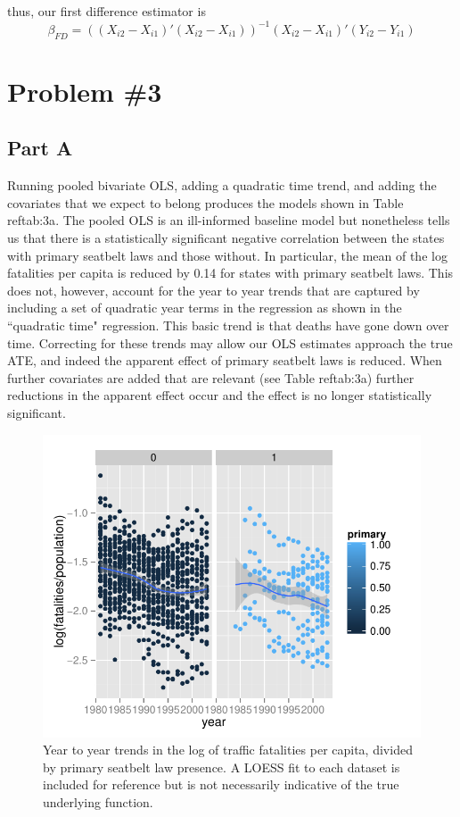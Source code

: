 \documentclass[letterpaper, 12pt]{article}
\begin{document}
thus, our first difference estimator is
\begin{equation}
\widehat{\beta_{FD}}=((X_{i2}-X_{i1})'(X_{i2}-X_{i1}))^{-1} (X_{i2}-X_{i1})'(Y_{i2}-Y_{i1})
\end{equation}

\section{Problem \#3}
\subsection{Part A}
Running pooled bivariate OLS, adding a quadratic time trend, and adding the covariates that we expect to belong produces the models shown in Table ref{tab:3a}.  The pooled OLS is an ill-informed baseline model but nonetheless tells us that there is a statistically significant negative correlation between the states with primary seatbelt laws and those without.  In particular, the mean of the log fatalities per capita is reduced by 0.14 for states with primary seatbelt laws.  This does not, however, account for the year to year trends that are captured by including a set of quadratic year terms in the regression as shown in the ``quadratic time" regression.  This basic trend is that deaths have gone down over time.  Correcting for these trends may allow our OLS estimates approach the true ATE, and indeed the apparent effect of primary seatbelt laws is reduced.  When further covariates are added that are relevant (see Table ref{tab:3a}) further reductions in the apparent effect occur and the effect is no longer statistically significant.  


\begin{figure}[htbp]
\begin{center}
\includegraphics{plot3a.pdf}
\caption{Year to year trends in the log of traffic fatalities per capita, divided by primary seatbelt law presence.  A LOESS fit to each dataset is included for reference but is not necessarily indicative of the true underlying function.}
\label{fig:3a}
\end{center}
\end{figure}
\end{document}
